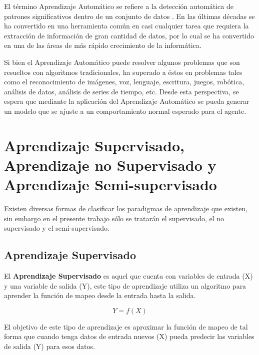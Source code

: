 El t\'{e}rmino Aprendizaje Autom\'{a}tico se refiere a la detecci\'{o}n autom\'{a}tica de patrones significativos dentro de un conjunto de datos \cite{32}. En las \'{u}ltimas d\'{e}cadas se ha convertido en una herramienta com\'{u}n en casi cualquier tarea que requiera la extracci\'{o}n de informaci\'{o}n de gran cantidad de datos, por lo cual se ha convertido en una de las \'{a}reas de m\'{a}s r\'{a}pido crecimiento de la inform\'{a}tica.

\vspace{5mm} %

Si bien el Aprendizaje Autom\'{a}tico puede resolver algunos problemas que son resueltos con algoritmos tradicionales, ha superado a \'{e}stos en problemas tales como el reconocimiento de im\'{a}genes, voz, lenguaje, escritura, juegos, rob\'{o}tica, an\'{a}lisis de datos, an\'{a}lisis de series de tiempo, etc. Desde esta perspectiva, se espera que mediante la aplicaci\'{o}n del Aprendizaje Autom\'{a}tico se pueda generar un modelo que se ajuste a un comportamiento normal esperado para el agente.



\section{Aprendizaje Supervisado, Aprendizaje no Supervisado y Aprendizaje Semi-supervisado}
\label{section|aprendizaje}

Existen diversas formas de clasificar los paradigmas de aprendizaje que existen, sin embargo en el presente trabajo s\'{o}lo se tratar\'{a}n el supervisado, el no supervisado y el semi-supervisado.

\subsection{Aprendizaje Supervisado}

El \textbf{Aprendizaje Supervisado} es aquel que cuenta con variables de entrada (X) y una variable de salida (Y), este tipo de aprendizaje utiliza un algoritmo para aprender la funci\'{o}n de mapeo desde la entrada hasta la salida.

\begin{equation}
Y = f(X)
\end{equation}

El objetivo de este tipo de aprendizaje es aproximar la funci\'{o}n de mapeo de tal forma que cuando tenga datos de entrada nuevos (X) pueda predecir las variables de salida (Y) para esos datos. 

